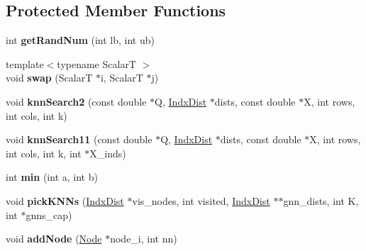 \subsection*{Protected Member Functions}
\begin{DoxyCompactItemize}
\item 
\hypertarget{classgnn_1_1GNN_ae6e5a1a1622c6499805be134fd96ca36}{int {\bfseries get\-Rand\-Num} (int lb, int ub)}\label{classgnn_1_1GNN_ae6e5a1a1622c6499805be134fd96ca36}

\item 
\hypertarget{classgnn_1_1GNN_a5020e3d998563b2279b0a4d125dad109}{{\footnotesize template$<$typename Scalar\-T $>$ }\\void {\bfseries swap} (Scalar\-T $\ast$i, Scalar\-T $\ast$j)}\label{classgnn_1_1GNN_a5020e3d998563b2279b0a4d125dad109}

\item 
\hypertarget{classgnn_1_1GNN_a8a4b8d1a5201f6c15b46d33a953889bc}{void {\bfseries knn\-Search2} (const double $\ast$Q, \hyperlink{structgnn_1_1IndxDist}{Indx\-Dist} $\ast$dists, const double $\ast$X, int rows, int cols, int k)}\label{classgnn_1_1GNN_a8a4b8d1a5201f6c15b46d33a953889bc}

\item 
\hypertarget{classgnn_1_1GNN_aeb77b996e512dd021a922d3f8aa2ef75}{void {\bfseries knn\-Search11} (const double $\ast$Q, \hyperlink{structgnn_1_1IndxDist}{Indx\-Dist} $\ast$dists, const double $\ast$X, int rows, int cols, int k, int $\ast$X\-\_\-inds)}\label{classgnn_1_1GNN_aeb77b996e512dd021a922d3f8aa2ef75}

\item 
\hypertarget{classgnn_1_1GNN_ad3a945133912195829a28db482d289ca}{int {\bfseries min} (int a, int b)}\label{classgnn_1_1GNN_ad3a945133912195829a28db482d289ca}

\item 
\hypertarget{classgnn_1_1GNN_a9d769573a9aef4d4b35047989c82de89}{void {\bfseries pick\-K\-N\-Ns} (\hyperlink{structgnn_1_1IndxDist}{Indx\-Dist} $\ast$vis\-\_\-nodes, int visited, \hyperlink{structgnn_1_1IndxDist}{Indx\-Dist} $\ast$$\ast$gnn\-\_\-dists, int K, int $\ast$gnns\-\_\-cap)}\label{classgnn_1_1GNN_a9d769573a9aef4d4b35047989c82de89}

\item 
\hypertarget{classgnn_1_1GNN_a2d8add065ffda33d9c4b56c431bbd67f}{void {\bfseries add\-Node} (\hyperlink{structgnn_1_1Node}{Node} $\ast$node\-\_\-i, int nn)}\label{classgnn_1_1GNN_a2d8add065ffda33d9c4b56c431bbd67f}

\end{DoxyCompactItemize}
